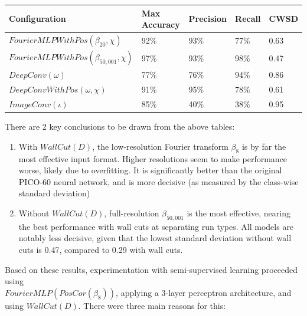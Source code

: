 \documentclass[10pt]{article}
\begin{document}
\begin{minipage}{\textwidth}
    \begin{center}
        \begin{tabular}{|l|l|l|l|l|}
            \hline
            Configuration & Max Accuracy & Precision & Recall & CWSD \\
            \hline
            $FourierMLPWithPos(\beta_{20}, \chi)$ & 92\% & 93\% & 77\% & 0.63 \\
            \hline
            $FourierMLPWithPos(\beta_{50,001}, \chi)$ & 97\% & 93\% & 98\% & 0.47 \\
            \hline
            $DeepConv(\omega)$ & 77\% & 76\% & 94\% & 0.86 \\
            \hline
            $DeepConvWithPos(\omega, \chi)$ & 91\% & 95\% & 78\% & 0.61 \\
            \hline
            $ImageConv(\iota)$ & 85\% & 40\% & 38\% & 0.95 \\
            \hline
        \end{tabular}
    \end{center}
\end{minipage}

There are 2 key conclusions to be drawn from the above tables:

\begin{enumerate}
    \item With $WallCut(D)$, the low-resolution Fourier transform $\beta_{8}$ is by far the most effective input format. Higher resolutions seem to make performance worse, likely due to overfitting. It is significantly better than the original PICO-60 neural network, and is more decisive (as measured by the class-wise standard deviation)
    \item Without $WallCut(D)$, full-resolution $\beta_{50,001}$ is the most effective, nearing the best performance with wall cuts at separating run types. All models are notably less decisive, given that the lowest standard deviation without wall cuts is 0.47, compared to 0.29 with wall cuts.
\end{enumerate}

Based on these results, experimentation with semi-supervised learning proceeded using \\ $FourierMLP(PosCor(\beta_{8}))$, applying a 3-layer perceptron architecture, and using $WallCut(D)$. There were three main reasons for this:
\end{document}
